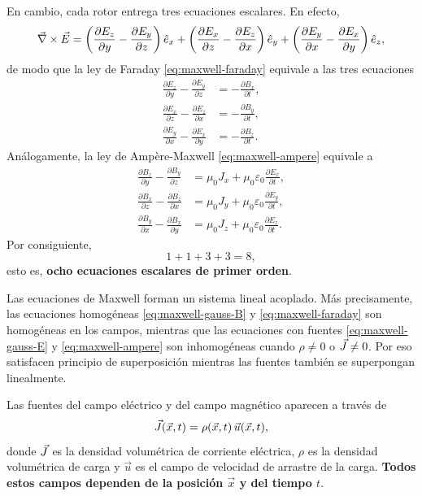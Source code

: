\documentclass[../main.tex]{subfiles}
\begin{document}
En cambio, cada rotor entrega tres ecuaciones escalares. En efecto,
\begin{equation*}
    \vec\nabla\times\vec{E}=
    \left(\frac{\partial E_z}{\partial y}-\frac{\partial E_y}{\partial z}\right)\hat e_x+
    \left(\frac{\partial E_x}{\partial z}-\frac{\partial E_z}{\partial x}\right)\hat e_y+
    \left(\frac{\partial E_y}{\partial x}-\frac{\partial E_x}{\partial y}\right)\hat e_z,
\end{equation*}
de modo que la ley de Faraday \eqref{eq:maxwell-faraday} equivale a las tres ecuaciones
\begin{align*}
    \frac{\partial E_z}{\partial y}-\frac{\partial E_y}{\partial z} &= -\frac{\partial B_x}{\partial t},\\
    \frac{\partial E_x}{\partial z}-\frac{\partial E_z}{\partial x} &= -\frac{\partial B_y}{\partial t},\\
    \frac{\partial E_y}{\partial x}-\frac{\partial E_x}{\partial y} &= -\frac{\partial B_z}{\partial t}.
\end{align*}
Análogamente, la ley de Ampère-Maxwell \eqref{eq:maxwell-ampere} equivale a
\begin{align*}
    \frac{\partial B_z}{\partial y}-\frac{\partial B_y}{\partial z} &= \mu_0 J_x+\mu_0\varepsilon_0\frac{\partial E_x}{\partial t},\\
    \frac{\partial B_x}{\partial z}-\frac{\partial B_z}{\partial x} &= \mu_0 J_y+\mu_0\varepsilon_0\frac{\partial E_y}{\partial t},\\
    \frac{\partial B_y}{\partial x}-\frac{\partial B_x}{\partial y} &= \mu_0 J_z+\mu_0\varepsilon_0\frac{\partial E_z}{\partial t}.
\end{align*}
Por consiguiente,
\begin{equation*}
    1+1+3+3=8,
\end{equation*}
esto es, \textbf{ocho ecuaciones escalares de primer orden}.

Las ecuaciones de Maxwell forman un sistema lineal acoplado. Más precisamente, las ecuaciones homogéneas \eqref{eq:maxwell-gauss-B} y \eqref{eq:maxwell-faraday} son homogéneas en los campos, mientras que las ecuaciones con fuentes \eqref{eq:maxwell-gauss-E} y \eqref{eq:maxwell-ampere} son inhomogéneas cuando $\rho\neq 0$ o $\vec{J}\neq 0$. Por eso satisfacen principio de superposición mientras las fuentes también se superpongan linealmente.

Las fuentes del campo eléctrico y del campo magnético aparecen a través de
\begin{equation*}
    \vec{J}(\vec x,t)=\rho(\vec x,t)\,\vec u(\vec x,t),
\end{equation*}
donde $\vec{J}$ es la densidad volumétrica de corriente eléctrica, $\rho$ es la densidad volumétrica de carga y $\vec u$ es el campo de velocidad de arrastre de la carga. \textbf{Todos estos campos dependen de la posición $\vec x$ y del tiempo $t$}. 
\end{document}
